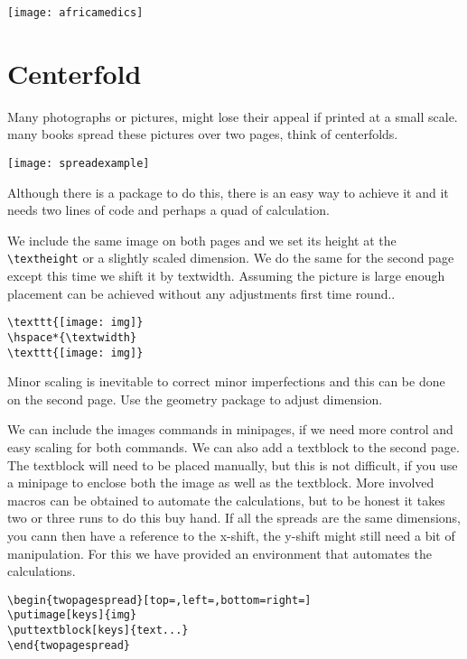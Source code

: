 \hspace*{-\textwidth} \texttt{[image: africamedics]}

\restoregeometry


\chapter{Centerfold}
Many photographs or pictures, might lose their appeal if printed at a small scale. many books spread these pictures over two pages, think of centerfolds.
\smallskip

\texttt{[image: spreadexample]}

\smallskip

Although there is a package to do this, there is an easy way to achieve it and it needs two lines of code and perhaps a quad of calculation.


We include the same image on both pages and we set its height at the \verb!\textheight! or a slightly scaled dimension. We do the same for the second page except this time we shift it by textwidth. Assuming the picture is large enough placement can be achieved without any adjustments first time round..

{\footnotesize
\begin{verbatim}
\texttt{[image: img]}
\hspace*{\textwidth}
\texttt{[image: img]}
\end{verbatim}}

Minor scaling is inevitable to correct minor imperfections and this can be done on the second page.
Use the geometry package to adjust dimension.




We can include the images commands in minipages, if we need more control and easy scaling for both commands. We can also add a textblock to the second page. The textblock will need to be placed manually, but this is not difficult, if you use a minipage to enclose both the image as well as the textblock.
More involved macros can be obtained to automate the calculations, but to be honest it takes two or three runs to do this buy hand. If all the spreads are the same dimensions, you cann then have a reference to the x-shift, the y-shift might still need a bit of manipulation. For this we have provided an environment that automates the calculations.
\begin{verbatim}
\begin{twopagespread}[top=,left=,bottom=right=]
\putimage[keys]{img}
\puttextblock[keys]{text...}
\end{twopagespread}
\end{verbatim}





